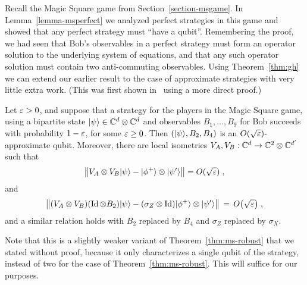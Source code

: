 Recall the Magic Square game from Section~\ref{section-msgame}. In Lemma~\ref{lemma-msperfect} we analyzed perfect strategies in this game and showed that any perfect strategy must ``have a qubit''. Remembering the proof, we had seen that Bob's observables in a perfect strategy must form an operator solution to the underlying system of equations, and that any such operator solution must contain two anti-commuting observables. Using Theorem~\ref{thm:gh} we can extend our earlier result to the case of approximate strategies with very little extra work. (This was first shown in~\cite{wu2016device} using a more direct proof.)

\begin{theorem}
\label{thm:rigid-ms}
Let $\varepsilon>0$, and suppose that a strategy for the players  in the Magic Square game, using  a bipartite state $|\psi\rangle\in\mathbb{C}^d\otimes \mathbb{C}^d$ and observables $B_1,\ldots,B_9$ for Bob succeeds with probability $1-\varepsilon$, for some $\varepsilon \geq 0$. Then $(|\psi\rangle,B_2,B_4)$ is an $O(\sqrt{\varepsilon})$-approximate qubit. Moreover, there are local isometries $V_A,V_B:\mathbb{C}^d \to \mathbb{C}^2 \otimes \mathbb{C}^{d'}$ such that 
\begin{equation}
\label{eq:chsh-state}
\big\| V_A \otimes V_B |\psi\rangle - |\phi^+\rangle \otimes |\psi'\rangle \big\| = O(\sqrt{\varepsilon}) \;,
\end{equation}
and 
\begin{equation}
\label{eq:chsh-alice}
\big\|( V_A \otimes V_B)( \mathop{\rm Id}\nolimits \otimes B_2 )|\psi\rangle - (\sigma_Z \otimes \mathop{\rm Id}\nolimits) |\phi^+\rangle \otimes |\psi'\rangle \big\| \,=\, O\big(\sqrt{\varepsilon}\big)\;,
\end{equation}
and a similar relation holds with $B_2$ replaced by $B_4$ and $\sigma_Z$ replaced by $\sigma_X$. 
\end{theorem}

Note that this is a slightly weaker variant of Theorem~\ref{thm:ms-robust} that we stated without proof, because it only characterizes a single qubit of the strategy, instead of two for the case of Theorem~\ref{thm:ms-robust}. This will suffice for our purposes. 

